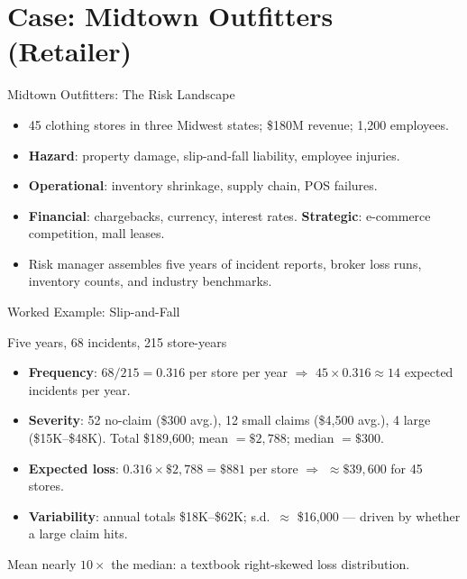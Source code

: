\documentclass[11pt, aspectratio=169]{beamer}
\begin{document}
\section{Case: Midtown Outfitters (Retailer)}

\begin{frame}{Midtown Outfitters: The Risk Landscape}
\begin{itemize}
  \item 45 clothing stores in three Midwest states; \$180M revenue; 1{,}200 employees.
  \item \textbf{Hazard}: property damage, slip-and-fall liability, employee injuries.
  \item \textbf{Operational}: inventory shrinkage, supply chain, POS failures.
  \item \textbf{Financial}: chargebacks, currency, interest rates. \textbf{Strategic}: e-commerce competition, mall leases.
  \item Risk manager assembles five years of incident reports, broker \alert{loss runs}, inventory counts, and industry benchmarks.
\end{itemize}
\end{frame}

\begin{frame}{Worked Example: Slip-and-Fall}
\begin{exampleblock}{Five years, 68 incidents, 215 store-years}
\begin{itemize}
  \item \textbf{Frequency}: $68 / 215 = 0.316$ per store per year $\Rightarrow$ $45 \times 0.316 \approx 14$ expected incidents per year.
  \item \textbf{Severity}: 52 no-claim (\$300 avg.), 12 small claims (\$4{,}500 avg.), 4 large (\$15K--\$48K). Total \$189{,}600; mean $= \$2{,}788$; median $= \$300$.
  \item \textbf{Expected loss}: $0.316 \times \$2{,}788 = \$881$ per store $\Rightarrow$ $\approx \$39{,}600$ for 45 stores.
  \item \textbf{Variability}: annual totals \$18K--\$62K; s.d.\ $\approx$ \$16{,}000 --- driven by whether a large claim hits.
\end{itemize}
\end{exampleblock}
Mean nearly $10\times$ the median: a textbook right-skewed loss distribution.
\end{frame}
\end{document}
